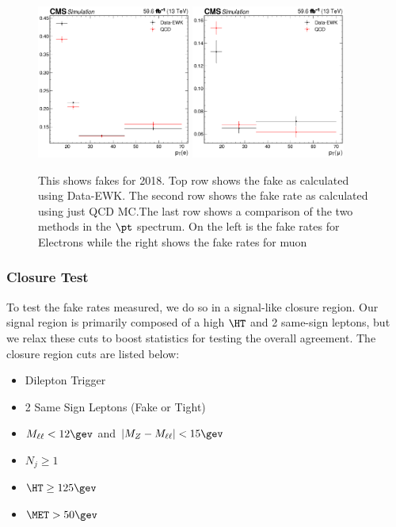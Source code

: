 \begin{figure}
  \includegraphics[width=0.45\textwidth]{measurement/2018/fr_Electron_pt.png} \hfill
  \includegraphics[width=0.45\textwidth]{measurement/2018/fr_Muon_pt.png} \\
  \caption{This shows fakes for 2018. Top row shows the fake as calculated using Data-EWK. The second row shows the fake rate as calculated using just QCD MC.\@ The last row shows a comparison of the two methods in the $\pt$ spectrum. On the left is the fake rates for Electrons while the right shows the fake rates for muon}
\end{figure}

\subsubsection{Closure Test}\label{sec:nonprompt:closure}

To test the fake rates measured, we do so in a signal-like closure region. Our signal region is primarily composed of a high $\HT$ and 2 same-sign leptons, but we relax these cuts to boost statistics for testing the overall agreement. The closure region cuts are listed below:

\begin{itemize}
  \item Dilepton Trigger
  \item 2 Same Sign Leptons (Fake or Tight)
  \item $M_{\ell\ell} < 12\gev$ and $|M_{Z}-M_{\ell\ell}| < 15\gev$
  \item $N_{j} \ge 1$
  \item $\HT \ge 125\gev$
  \item $\MET > 50\gev$
\end{itemize}

